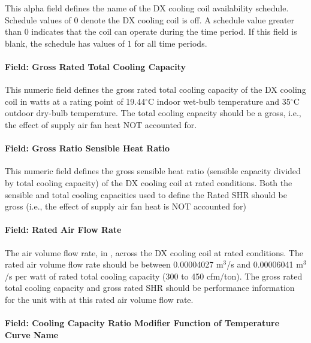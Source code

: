 This alpha field defines the name of the DX cooling coil availability schedule. Schedule values of 0 denote the DX cooling coil is off. A schedule value greater than 0 indicates that the coil can operate during the time period. If this field is blank, the schedule has values of 1 for all time periods.

\paragraph{Field: Gross Rated Total Cooling Capacity}\label{field-gross-rated-total-cooling-capacity}

This numeric field defines the gross rated total cooling capacity of the DX cooling coil in watts at a rating point of 19.44$^\circ$C indoor wet-bulb temperature and 35$^\circ$C outdoor dry-bulb temperature. The total cooling capacity should be a gross, i.e., the effect of supply air fan heat NOT accounted for.

\paragraph{Field: Gross Ratio Sensible Heat Ratio}\label{field-gross-ratio-sensible-heat-ratio}

This numeric field defines the gross sensible heat ratio (sensible capacity divided by total cooling capacity) of the DX cooling coil at rated conditions. Both the sensible and total cooling capacities used to define the Rated SHR should be gross (i.e., the effect of supply air fan heat is NOT accounted for)

\paragraph{Field: Rated Air Flow Rate}\label{field-rated-air-flow-rate}

The air volume flow rate, in \si{\volumeFlowRate}, across the DX cooling coil at rated conditions. The rated air volume flow rate should be between 0.00004027 m\(^{3}\)/s and 0.00006041 m\(^{3}\)/s per watt of rated total cooling capacity (300 to 450 cfm/ton). The gross rated total cooling capacity and gross rated SHR should be performance information for the unit with at this rated air volume flow rate.

\paragraph{Field: Cooling Capacity Ratio Modifier Function of Temperature Curve Name}\label{field-cooling-capacity-ratio-modifier-function-of-temperature-curve-name}


